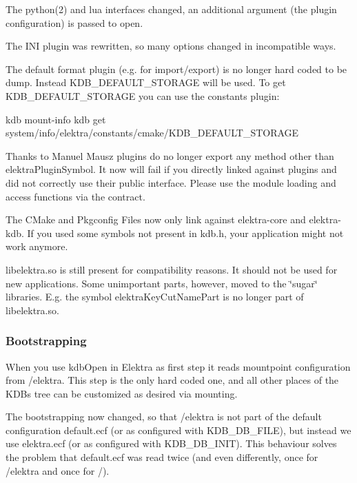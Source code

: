 The python(2) and lua interfaces changed, an additional argument (the plugin configuration) is passed to {\ttfamily open}.

The I\+NI plugin was rewritten, so many options changed in incompatible ways.

The default format plugin (e.\+g. for import/export) is no longer hard coded to be {\ttfamily dump}. Instead K\+D\+B\+\_\+\+D\+E\+F\+A\+U\+L\+T\+\_\+\+S\+T\+O\+R\+A\+GE will be used. To get K\+D\+B\+\_\+\+D\+E\+F\+A\+U\+L\+T\+\_\+\+S\+T\+O\+R\+A\+GE you can use the constants plugin\+: \begin{DoxyVerb}kdb mount-info
kdb get system/info/elektra/constants/cmake/KDB_DEFAULT_STORAGE
\end{DoxyVerb}


Thanks to Manuel Mausz plugins do no longer export any method other than {\ttfamily elektra\+Plugin\+Symbol}. It now will fail if you directly linked against plugins and did not correctly use their public interface. Please use the module loading and access functions via the contract.

The C\+Make and Pkgconfig Files now only link against {\ttfamily elektra-\/core} and {\ttfamily elektra-\/kdb}. If you used some symbols not present in {\ttfamily kdb.\+h}, your application might not work anymore.

{\ttfamily libelektra.\+so} is still present for compatibility reasons. It should not be used for new applications. Some unimportant parts, however, moved to the \char`\"{}sugar\char`\"{} libraries. E.\+g. the symbol {\ttfamily elektra\+Key\+Cut\+Name\+Part} is no longer part of {\ttfamily libelektra.\+so}.

\subsubsection*{Bootstrapping}

When you use {\ttfamily kdb\+Open} in Elektra as first step it reads mountpoint configuration from {\ttfamily /elektra}. This step is the only hard coded one, and all other places of the K\+DB\textquotesingle{}s tree can be customized as desired via mounting.

The bootstrapping now changed, so that {\ttfamily /elektra} is not part of the default configuration {\ttfamily default.\+ecf} (or as configured with {\ttfamily K\+D\+B\+\_\+\+D\+B\+\_\+\+F\+I\+LE}), but instead we use {\ttfamily elektra.\+ecf} (or as configured with {\ttfamily K\+D\+B\+\_\+\+D\+B\+\_\+\+I\+N\+IT}). This behaviour solves the problem that {\ttfamily default.\+ecf} was read twice (and even differently, once for {\ttfamily /elektra} and once for {\ttfamily /}).

